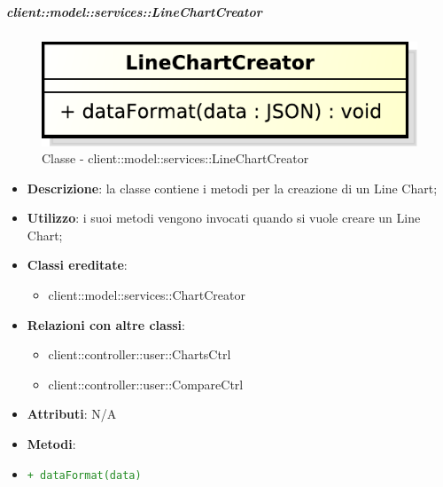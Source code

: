 		\subparagraph{client::model::services::LineChartCreator} %
		\label{subp:linechartcreator}
			\begin{figure}[htbp]
				\centering
				\centerline{\includegraphics[scale=0.7]{./images/client/classes/model/line_chart_creator.pdf}}
				\caption{Classe - client::model::services::LineChartCreator}
			\end{figure}
			\begin{itemize}
				\item \textbf{Descrizione}: la classe contiene i metodi per la creazione di un Line Chart;
				\item \textbf{Utilizzo}: i suoi metodi vengono invocati quando si vuole creare un Line Chart;
				\item \textbf{Classi ereditate}:
					\begin{itemize}
						\item client::model::services::ChartCreator
					\end{itemize}
				\item \textbf{Relazioni con altre classi}:
					\begin{itemize}
						\item client::controller::user::ChartsCtrl
						\item client::controller::user::CompareCtrl
					\end{itemize}
				\item \textbf{Attributi}: N/A
				\item \textbf{Metodi}: 
					\item \textcolor{forestgreen}{\texttt{+ dataFormat(data)}}
			\end{itemize}


